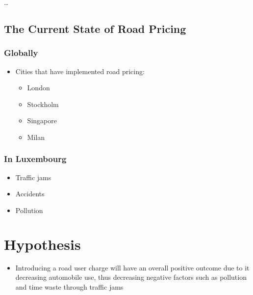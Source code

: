 \documentclass[
      a4paper,
        12pt,
          oneside,
      ]{article}
\providecommand{\tightlist}{
  \setlength{\itemsep}{0pt}
  \setlength{\parskip}{0pt}
}
\begin{document}
\ldots{}

\hypertarget{the-current-state-of-road-pricing}{%
\subsection{The Current State of Road
Pricing}\label{the-current-state-of-road-pricing}}

\hypertarget{globally}{%
\subsubsection{Globally}\label{globally}}

\begin{itemize}
\tightlist
\item
  Cities that have implemented road pricing:

  \begin{itemize}
  \tightlist
  \item
    London
  \item
    Stockholm
  \item
    Singapore
  \item
    Milan
  \end{itemize}
\end{itemize}

\hypertarget{in-luxembourg}{%
\subsubsection{In Luxembourg}\label{in-luxembourg}}

\begin{itemize}
\tightlist
\item
  Traffic jams
\item
  Accidents
\item
  Pollution
\end{itemize}

\hypertarget{hypothesis}{%
\section{Hypothesis}\label{hypothesis}}

\begin{itemize}
\tightlist
\item
  Introducing a road user charge will have an overall positive outcome
  due to it decreasing automobile use, thus decreasing negative factors
  such as pollution and time waste through traffic jams
\end{itemize}
\end{document}
